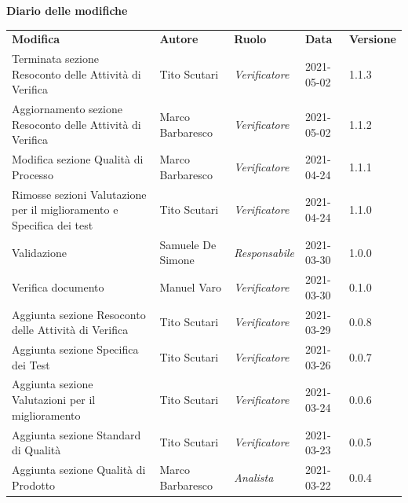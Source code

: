 \documentclass[a4paper]{article}
\begin{document}
\begin{center}
    \textbf{\Large Diario delle modifiche}\\
    \vspace{10px}
    \begin{table}[h!]
        \centering
        \renewcommand{\arraystretch}{1.8}
        \begin{tabular}{p{150px} p{90px} p{60px} p{60px} p{45px}}
            \rowcolor{logo!70} \textbf{Modifica}                  & \textbf{Autore}   & \textbf{Ruolo}        & \textbf{Data} & \textbf{Versione} \\
            Terminata sezione Resoconto delle Attività di Verifica & Tito Scutari & \textit{Verificatore} & 2021-05-02               & 1.1.3 \\
            Aggiornamento sezione Resoconto delle Attività di Verifica & Marco Barbaresco & \textit{Verificatore}       & 2021-05-02        & 1.1.2  \\                 
            Modifica sezione Qualità di Processo                  & Marco Barbaresco  & \textit{Verificatore}           & 2021-04-24        & 1.1.1  \\
            Rimosse sezioni Valutazione per il miglioramento e Specifica dei test & Tito Scutari & \textit{Verificatore} & 2021-04-24       & 1.1.0 \\
            Validazione                                           & Samuele De Simone & \textit{Responsabile} & 2021-03-30    & 1.0.0             \\
            Verifica documento                                    & Manuel Varo       & \textit{Verificatore} & 2021-03-30    & 0.1.0             \\
            Aggiunta sezione Resoconto delle Attività di Verifica & Tito Scutari      & \textit{Verificatore} & 2021-03-29    & 0.0.8             \\
            Aggiunta sezione Specifica dei Test                   & Tito Scutari      & \textit{Verificatore} & 2021-03-26    & 0.0.7             \\
            Aggiunta sezione Valutazioni per il miglioramento     & Tito Scutari      & \textit{Verificatore} & 2021-03-24    & 0.0.6             \\
            Aggiunta sezione Standard di Qualità                  & Tito Scutari      & \textit{Verificatore} & 2021-03-23    & 0.0.5             \\
            Aggiunta sezione Qualità di Prodotto                  & Marco Barbaresco  & \textit{Analista}     & 2021-03-22    & 0.0.4             \\

\end{tabular}
\end{table}
\end{center}
\end{document}
